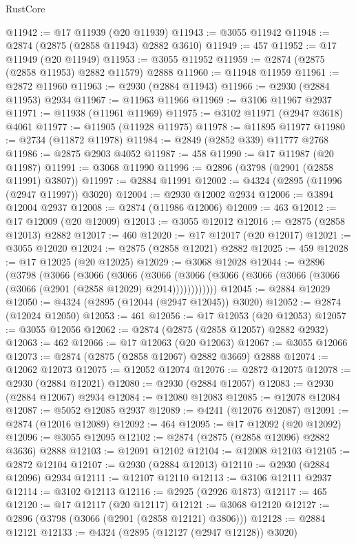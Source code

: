 \begin{lexlean}{RustCore}
\begin{coremodule}
@11942 := @17 @11939 (@20 @11939)
@11943 := @3055 @11942
@11948 := @2874 (@2875 (@2858 @11943) @2882 @3610)
@11949 := 457
@11952 := @17 @11949 (@20 @11949)
@11953 := @3055 @11952
@11959 := @2874 (@2875 (@2858 @11953) @2882 @11579) @2888
@11960 := @11948 @11959
@11961 := @2872 @11960
@11963 := @2930 (@2884 @11943)
@11966 := @2930 (@2884 @11953) @2934
@11967 := @11963 @11966
@11969 := @3106 @11967 @2937
@11971 := @11938 (@11961 @11969)
@11975 := @3102 @11971 (@2947 @3618) @4061
@11977 := @11905 (@11928 @11975)
@11978 := @11895 @11977
@11980 := @2734 (@11872 @11978)
@11984 := @2849 (@2852 @339) @11777 @2768
@11986 := @2875 @2903 @4052
@11987 := 458
@11990 := @17 @11987 (@20 @11987)
@11991 := @3068 @11990
@11996 := @2896 (@3798 (@2901 (@2858 @11991) @3807))
@11997 := @2884 @11991
@12002 := @4324 (@2895 (@11996 (@2947 @11997)) @3020)
@12004 := @2930 @12002 @2934
@12006 := @3894 @12004 @2937
@12008 := @2874 (@11986 @12006)
@12009 := 463
@12012 := @17 @12009 (@20 @12009)
@12013 := @3055 @12012
@12016 := @2875 (@2858 @12013) @2882
@12017 := 460
@12020 := @17 @12017 (@20 @12017)
@12021 := @3055 @12020
@12024 := @2875 (@2858 @12021) @2882
@12025 := 459
@12028 := @17 @12025 (@20 @12025)
@12029 := @3068 @12028
@12044 := @2896
    (@3798
      (@3066
        (@3066
          (@3066
            (@3066 (@3066 (@3066 (@3066 (@3066 (@3066 (@3066 (@2901 (@2858 @12029) @2914))))))))))))
@12045 := @2884 @12029
@12050 := @4324 (@2895 (@12044 (@2947 @12045)) @3020)
@12052 := @2874 (@12024 @12050)
@12053 := 461
@12056 := @17 @12053 (@20 @12053)
@12057 := @3055 @12056
@12062 := @2874 (@2875 (@2858 @12057) @2882 @2932)
@12063 := 462
@12066 := @17 @12063 (@20 @12063)
@12067 := @3055 @12066
@12073 := @2874 (@2875 (@2858 @12067) @2882 @3669) @2888
@12074 := @12062 @12073
@12075 := @12052 @12074
@12076 := @2872 @12075
@12078 := @2930 (@2884 @12021)
@12080 := @2930 (@2884 @12057)
@12083 := @2930 (@2884 @12067) @2934
@12084 := @12080 @12083
@12085 := @12078 @12084
@12087 := @5052 @12085 @2937
@12089 := @4241 (@12076 @12087)
@12091 := @2874 (@12016 @12089)
@12092 := 464
@12095 := @17 @12092 (@20 @12092)
@12096 := @3055 @12095
@12102 := @2874 (@2875 (@2858 @12096) @2882 @3636) @2888
@12103 := @12091 @12102
@12104 := @12008 @12103
@12105 := @2872 @12104
@12107 := @2930 (@2884 @12013)
@12110 := @2930 (@2884 @12096) @2934
@12111 := @12107 @12110
@12113 := @3106 @12111 @2937
@12114 := @3102 @12113
@12116 := @2925 (@2926 @1873)
@12117 := 465
@12120 := @17 @12117 (@20 @12117)
@12121 := @3068 @12120
@12127 := @2896 (@3798 (@3066 (@2901 (@2858 @12121) @3806)))
@12128 := @2884 @12121
@12133 := @4324 (@2895 (@12127 (@2947 @12128)) @3020)

\end{coremodule}
\end{lexlean}

